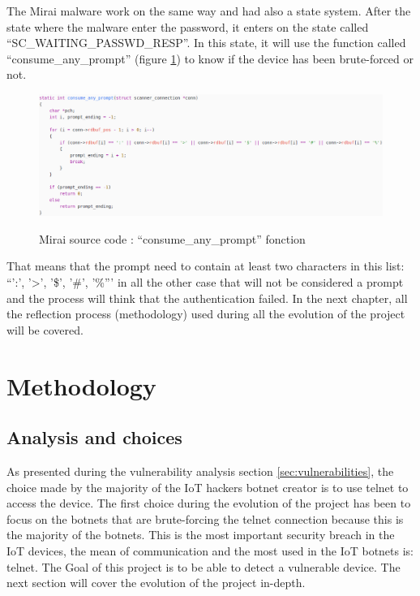 \documentclass{report}
\begin{document}
The Mirai malware work on the same way and had also a state system. After the state where the malware enter the password, it enters on the state called ``SC\_WAITING\_PASSWD\_RESP''. In this state, it will use the function called ``consume\_any\_prompt'' (figure \ref{fig:mirai-prompt}) to know if the device has been brute-forced or not.

\begin{figure}
  \caption{Mirai source code : ``consume\_any\_prompt'' fonction}
 \centering
 \includegraphics[width=1.2\textwidth]{./img/mirai-prompt}
 \label{fig:mirai-prompt}
\end{figure}
That means that the prompt need to contain at least two characters in this list: ``':', '>', '\$', '\#', '\%''' in all the other case that will not be considered a prompt and the process will think that the authentication failed.\newline
In the next chapter, all the reflection process (methodology) used during all the evolution of the project will be covered.

\chapter{Methodology}
\section{Analysis and choices}
As presented during the vulnerability analysis section \ref{sec:vulnerabilities}, the choice made by the majority of the IoT hackers botnet creator is to use telnet to access the device. \newline
The first choice during the evolution of the project has been to focus on the botnets that are brute-forcing the telnet connection because this is the majority of the botnets.
This is the most important security breach in the IoT devices, the mean of communication and the most used in the IoT botnets is: telnet. The Goal of this project is to be able to detect a vulnerable device.\newline
The next section will cover the evolution of the project in-depth.
\end{document}

